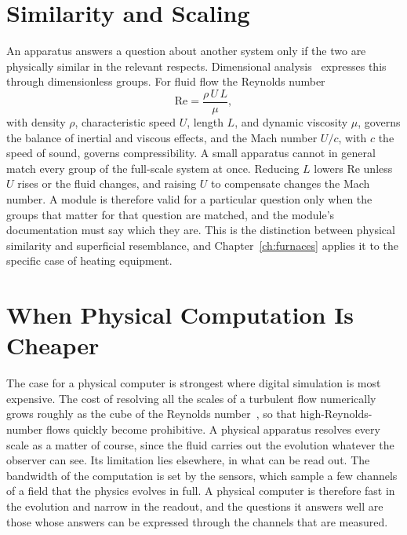 \section{Similarity and Scaling}

An apparatus answers a question about another system only if the two are physically similar in the relevant respects. Dimensional analysis~\cite{buckingham1914} expresses this through dimensionless groups. For fluid flow the Reynolds number
\[
\mathrm{Re}=\frac{\rho\,U\,L}{\mu},
\]
with density $\rho$, characteristic speed $U$, length $L$, and dynamic viscosity $\mu$, governs the balance of inertial and viscous effects, and the Mach number $U/c$, with $c$ the speed of sound, governs compressibility. A small apparatus cannot in general match every group of the full-scale system at once. Reducing $L$ lowers $\mathrm{Re}$ unless $U$ rises or the fluid changes, and raising $U$ to compensate changes the Mach number. A module is therefore valid for a particular question only when the groups that matter for that question are matched, and the module's documentation must say which they are. This is the distinction between physical similarity and superficial resemblance, and Chapter~\ref{ch:furnaces} applies it to the specific case of heating equipment.

\section{When Physical Computation Is Cheaper}

The case for a physical computer is strongest where digital simulation is most expensive. The cost of resolving all the scales of a turbulent flow numerically grows roughly as the cube of the Reynolds number~\cite{pope2000}, so that high-Reynolds-number flows quickly become prohibitive. A physical apparatus resolves every scale as a matter of course, since the fluid carries out the evolution whatever the observer can see. Its limitation lies elsewhere, in what can be read out. The bandwidth of the computation is set by the sensors, which sample a few channels of a field that the physics evolves in full. A physical computer is therefore fast in the evolution and narrow in the readout, and the questions it answers well are those whose answers can be expressed through the channels that are measured.

